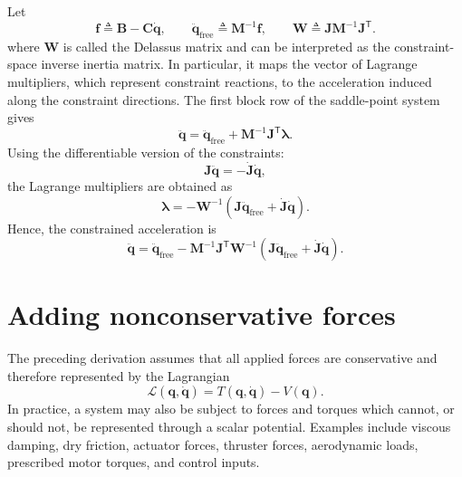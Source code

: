 \documentclass{article}
\begin{document}
Let
\begin{equation}
\bm f
\triangleq \bm B-\bm C\dot{\bm q},
\qquad
\ddot{\bm q}_{\mathrm{free}}
\triangleq \bm M^{-1}\bm f,
\qquad
\bm W
\triangleq \bm J\bm M^{-1}\bm J^{\mathsf T}.
\end{equation}
where $\bm W$ is called the Delassus matrix and can be interpreted as the constraint-space inverse inertia matrix. 
In particular, it maps the vector of Lagrange multipliers, which represent constraint reactions, to the acceleration induced along the constraint directions.
The first block row of the saddle-point system gives
\begin{equation*}
\ddot{\bm q}
=
\ddot{\bm q}_{\mathrm{free}}
+
\bm M^{-1}\bm J^{\mathsf T}\bm\lambda.
\end{equation*}
%
Using the differentiable version of the constraints:
\begin{equation*}
\bm J\ddot{\bm q}
=
-\dot{\bm J}\dot{\bm q},
\end{equation*}
%
the Lagrange multipliers are obtained as
\begin{equation}
\boxed{
\bm\lambda
=
-\bm W^{-1}
\left(
\bm J\ddot{\bm q}_{\mathrm{free}}
+
\dot{\bm J}\dot{\bm q}
\right).
}
\end{equation}
%
Hence, the constrained acceleration is
\begin{equation}
\boxed{
\ddot{\bm q}
=
\ddot{\bm q}_{\mathrm{free}}
-
\bm M^{-1}\bm J^{\mathsf T}\bm W^{-1}
\left(
\bm J\ddot{\bm q}_{\mathrm{free}}
+
\dot{\bm J}\dot{\bm q}
\right).
}
\end{equation}

\section{Adding nonconservative forces}

The preceding derivation assumes that all applied forces are conservative and
therefore represented by the Lagrangian
\[
\mathcal L(\bm q,\dot{\bm q}) = T(\bm q,\dot{\bm q}) - V(\bm q).
\]
In practice, a system may also be subject to forces and torques which cannot,
or should not, be represented through a scalar potential. Examples include
viscous damping, dry friction, actuator forces, thruster forces, aerodynamic
loads, prescribed motor torques, and control inputs.
\end{document}
